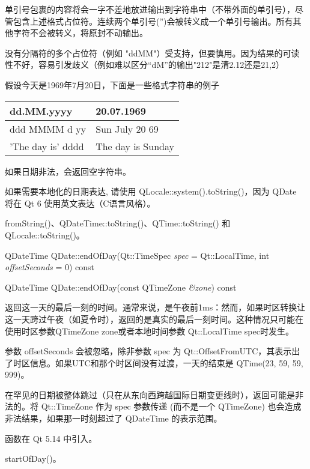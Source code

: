 单引号包裹的内容将会一字不差地放进输出到字符串中（不带外面的单引号），尽管包含上述格式占位符。连续两个单引号('')会被转义成一个单引号输出。所有其他字符不会被转义，将原封不动输出。

没有分隔符的多个占位符（例如 "ddMM"）受支持，但要慎用。因为结果的可读性不好，容易引发歧义（例如难以区分“dM”的输出"212"是清2.12还是21,2）

假设今天是1969年7月20日，下面是一些格式字符串的例子

\begin{tabular}{|l|l|}
\hline
dd.MM.yyyy	&20.07.1969\\
\hline
ddd MMMM d yy&	Sun July 20 69\\
\hline
'The day is' dddd&	The day is Sunday\\
\hline
\end{tabular}

如果日期非法，会返回空字符串。


\begin{notice}
如果需要本地化的日期表达, 请使用 QLocale::system().toString()，因为 QDate 将在 Qt 6 使用英文表达（C语言风格）。
\end{notice}


\begin{seeAlso}
fromString()、QDateTime::toString()、QTime::toString() 和
QLocale::toString()。
\end{seeAlso}


\splitLine

QDateTime QDate::endOfDay(Qt::TimeSpec \emph{spec} = Qt::LocalTime, int \emph{offsetSeconds} = 0) const

QDateTime QDate::endOfDay(const QTimeZone \emph{\&zone}) const

返回这一天的最后一刻的时间。通常来说，是午夜前1ms：然而，如果时区转换让这一天跨过午夜（如夏令时），返回的是真实的最后一刻时间。这种情况只可能在使用时区参数QTimeZone zone或者本地时间参数 Qt::LocalTime spec时发生。

参数 offsetSeconds 会被忽略，除非参数 spec 为 Qt::OffsetFromUTC，其表示出了时区信息。如果UTC和那个时区间没有过渡，一天的结束是 QTime(23, 59, 59, 999)。

在罕见的日期被整体跳过（只在从东向西跨越国际日期变更线时），返回可能是非法的。将 Qt::TimeZone 作为 spec 参数传递 (而不是一个 QTimeZone) 也会造成非法结果，如果那一时刻超过了 QDateTime 的表示范围。

函数在 Qt 5.14 中引入。


\begin{seeAlso}
startOfDay()。
\end{seeAlso}

